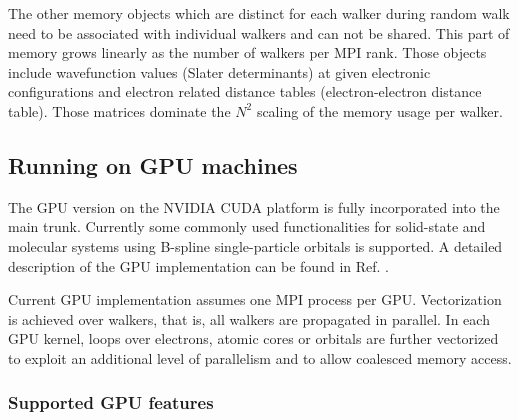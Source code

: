 The other memory objects which are distinct for each walker during random walk need to be associated with individual walkers and can not be shared. This part of memory grows linearly as the number of walkers per MPI rank. Those objects include wavefunction values (Slater determinants) at given electronic configurations and electron related distance tables (electron-electron distance table). Those matrices dominate the $N^2$ scaling of the memory usage per walker.

\subsection{Running on GPU machines}
\label{sec:gpurunning}

The GPU version on the NVIDIA CUDA platform is fully incorporated into
the main trunk. Currently some commonly used functionalities for
solid-state and molecular systems using B-spline single-particle
orbitals is supported. A detailed description of the GPU
implementation can be found in Ref. \cite{EslerKimCeperleyShulenburger2012}.

Current GPU implementation assumes one MPI process per GPU.
Vectorization is achieved over walkers, that is, all walkers are
propagated in parallel. In each GPU kernel, loops over electrons,
atomic cores or orbitals are further vectorized to exploit an
additional level of parallelism and to allow coalesced memory access.


\subsubsection{Supported GPU features}

